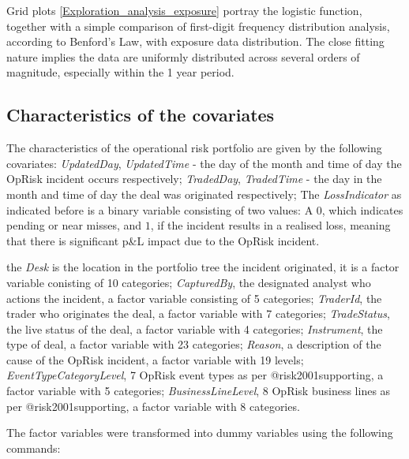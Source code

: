 \documentclass[]{article}
\begin{document}
Grid plots \ref{Exploration_analysis_exposure} portray the logistic
function, together with a simple comparison of first-digit frequency
distribution analysis, according to Benford's Law, with exposure data
distribution. The close fitting nature implies the data are uniformly
distributed across several orders of magnitude, especially within the 1
year period.\medskip

\subsection{Characteristics of the covariates}

The characteristics of the operational risk portfolio are given by the
following covariates: \emph{UpdatedDay}, \emph{UpdatedTime} - the day of
the month and time of day the OpRisk incident occurs respectively;
\emph{TradedDay}, \emph{TradedTime} - the day in the month and time of
day the deal was originated respectively; The \emph{LossIndicator} as
indicated before is a binary variable consisting of two values: A \(0\),
which indicates pending or near misses, and \(1\), if the incident
results in a realised loss, meaning that there is significant p\&L
impact due to the OpRisk incident.\medskip

the \emph{Desk} is the location in the portfolio tree the incident
originated, it is a factor variable conisting of 10 categories;
\emph{CapturedBy}, the designated analyst who actions the incident, a
factor variable consisting of 5 categories; \emph{TraderId}, the trader
who originates the deal, a factor variable with 7 categories;
\emph{TradeStatus}, the live status of the deal, a factor variable with
4 categories; \emph{Instrument}, the type of deal, a factor variable
with 23 categories; \emph{Reason}, a description of the cause of the
OpRisk incident, a factor variable with 19 levels;
\emph{EventTypeCategoryLevel}, 7 OpRisk event types as per
@risk2001supporting, a factor variable with 5 categories;
\emph{BusinessLineLevel}, 8 OpRisk business lines as per
@risk2001supporting, a factor variable with 8 categories.\medskip

The factor variables were transformed into dummy variables using the
following commands: \singlespacing
\end{document}
